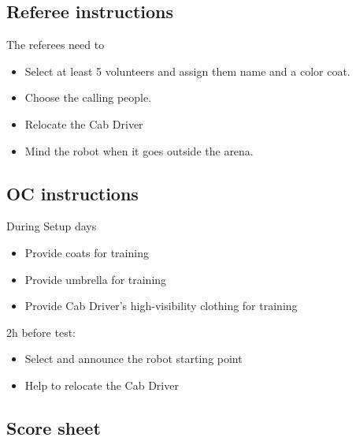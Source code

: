 \subsection{Referee instructions}

The referees need to
\begin{itemize}
	\item Select at least 5 volunteers and assign them name and a color coat.
	\item Choose the calling people.
	\item Relocate the Cab Driver
	\item Mind the robot when it goes outside the arena.
\end{itemize}

\subsection{OC instructions}
During Setup days
\begin{itemize}
	\item Provide coats for training
	\item Provide umbrella for training
	\item Provide Cab Driver's high-visibility clothing for training
\end{itemize}

2h before test:
\begin{itemize}
	\item Select and announce the robot starting point
	\item Help to relocate the Cab Driver
\end{itemize}

\subsection{Score sheet}

